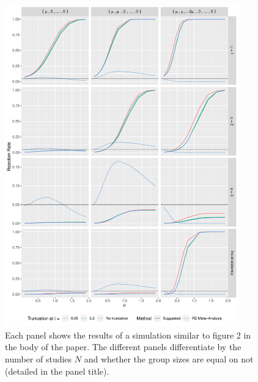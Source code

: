 \documentclass[useAMS,usenatbib,referee]{biom}
\theoremstyle{plain}
\begin{document}
	\begin{figure}[htpb]
		\centering
		\includegraphics[page = 2, width=0.9\textwidth]{sim2_all.pdf} 
		\caption{ Each panel shows the results of a simulation similar to figure 2 in the body of the paper. The different panels differentiate by the number of studies $N$ and whether the group sizes are equal on not (detailed in the panel title).
		}\label{fig-sim2_extensions1}
	\end{figure}
	
\end{document}
